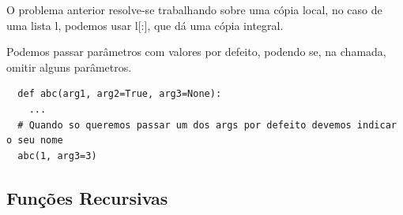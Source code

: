 \documentclass{article}
\begin{document}
O problema anterior resolve-se trabalhando sobre uma cópia local,
no caso de uma lista l, podemos usar l[:], que dá uma cópia integral.

\pagebreak

Podemos passar parâmetros com valores por defeito, podendo se, na chamada,
omitir alguns parâmetros.

\begin{lstlisting}
  def abc(arg1, arg2=True, arg3=None):
    ...
  # Quando so queremos passar um dos args por defeito devemos indicar o seu nome
  abc(1, arg3=3)
\end{lstlisting}

\subsection{Funções Recursivas}
\end{document}
